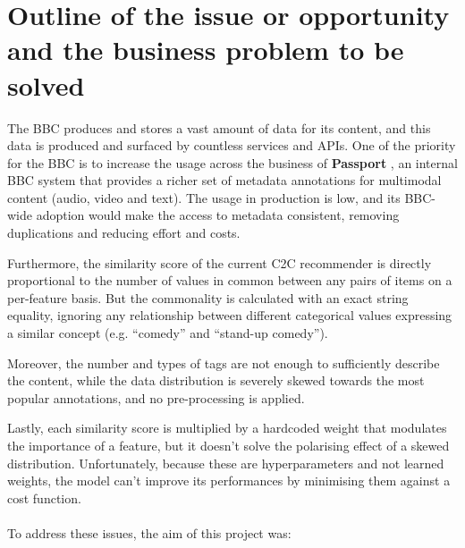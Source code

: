 
\section{Outline of the issue or opportunity and the business problem to be solved}

The BBC produces and stores a vast amount of data for its content, and this data is produced and surfaced by countless services and APIs.
One of the priority for the BBC is to increase the usage across the business of \textbf{Passport} \cite{BBC:PassportMetadata}, an internal BBC
system that provides a richer set of metadata annotations for multimodal content (audio, video and text).
The usage in production is low, and its BBC-wide adoption would make the access to metadata consistent,
removing duplications and reducing effort and costs.

Furthermore, the similarity score of the current C2C recommender is directly proportional to the number of values in common between any pairs of items
on a per-feature basis. But the commonality is calculated with an exact string equality, ignoring any relationship between different
categorical values expressing a similar concept (e.g. ``comedy'' and ``stand-up comedy'').

Moreover, the number and types of tags are not enough to sufficiently
describe the content, while the data distribution is severely skewed towards the most popular annotations, and no pre-processing
is applied.

Lastly, each similarity score is multiplied by a hardcoded weight that modulates the importance of a feature, but it doesn't solve
the polarising effect of a skewed distribution. Unfortunately, because these are hyperparameters and not learned weights, the model can't improve
its performances by minimising them against a cost function.
\\ \\
To address these issues, the aim of this project was:

